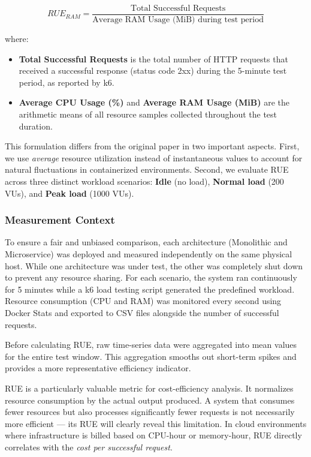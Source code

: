 \begin{equation}
RUE_{RAM} = \frac{\text{Total Successful Requests}}{\text{Average RAM Usage (MiB) during test period}}
\label{eq:rue_ram}
\end{equation}

where:
\begin{itemize}
    \item \textbf{Total Successful Requests} is the total number of HTTP requests that received a successful response (status code 2xx) during the 5-minute test period, as reported by k6.
    \item \textbf{Average CPU Usage (\%)} and \textbf{Average RAM Usage (MiB)} are the arithmetic means of all resource samples collected throughout the test duration.
\end{itemize}

This formulation differs from the original paper in two important aspects. First, we use \textit{average} resource utilization instead of instantaneous values to account for natural fluctuations in containerized environments. Second, we evaluate RUE across three distinct workload scenarios: \textbf{Idle} (no load), \textbf{Normal load} (200 VUs), and \textbf{Peak load} (1000 VUs).

\subsubsection{Measurement Context}

To ensure a fair and unbiased comparison, each architecture (Monolithic and Microservice) was deployed and measured independently on the same physical host. While one architecture was under test, the other was completely shut down to prevent any resource sharing. For each scenario, the system ran continuously for 5 minutes while a k6 load testing script generated the predefined workload. Resource consumption (CPU and RAM) was monitored every second using Docker Stats and exported to CSV files alongside the number of successful requests.

Before calculating RUE, raw time-series data were aggregated into mean values for the entire test window. This aggregation smooths out short-term spikes and provides a more representative efficiency indicator.

RUE is a particularly valuable metric for cost-efficiency analysis. It normalizes resource consumption by the actual output produced. A system that consumes fewer resources but also processes significantly fewer requests is not necessarily more efficient — its RUE will clearly reveal this limitation. In cloud environments where infrastructure is billed based on CPU-hour or memory-hour, RUE directly correlates with the \textit{cost per successful request}.

